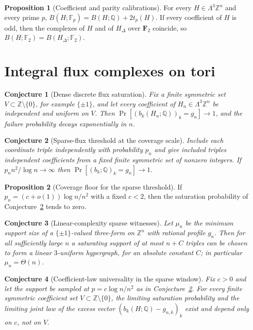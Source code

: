 \documentclass[11pt]{article}
\newtheorem{conjecture}{Conjecture}
\theoremstyle{definition}
\newcommand{\Z}{\mathbb Z}
\providecommand{\Z}{\mathbb Z}
\newtheorem{proposition}{Proposition}
\begin{document}
\begin{proposition}[Coefficient and parity calibrations]\label{aa:uct}
For every $H\in\Lambda^3\Z^n$ and every prime $p$, $B(H;\mathbb F_p)=B(H;\mathbb Q)+2t_p(H)$.  If every coefficient of $H$ is odd, then the complexes of $H$ and of $H_\Delta$ over $\mathbf F_2$ coincide, so $B(H;\mathbb F_2)=B(H_\Delta;\mathbb F_2)$.
\end{proposition}

\section{Integral flux complexes on tori}

\begin{conjecture}[Dense discrete flux saturation]\label{aa1}
Fix a finite symmetric set $V\subset\Z\setminus\{0\}$, for example $\{\pm1\}$, and let every coefficient of $H_n\in\Lambda^3\Z^n$ be independent and uniform on $V$.  Then $\Pr[(b_k(H_n;\mathbb Q))_k=g_n]\to1$, and the failure probability decays exponentially in $n$.
\end{conjecture}

\begin{conjecture}[Sparse-flux threshold at the coverage scale]\label{aa2}
Include each coordinate triple independently with probability $p_n$ and give included triples independent coefficients from a fixed finite symmetric set of nonzero integers.  If $p_nn^2/\log n\to\infty$ then $\Pr[(b_k;\mathbb Q)_k=g_n]\to1$.
\end{conjecture}

\begin{proposition}[Coverage floor for the sparse threshold]\label{aa:coverage}
If $p_n=(c+o(1))\log n/n^2$ with a fixed $c<2$, then the saturation probability of Conjecture~\ref{aa2} tends to zero.
\end{proposition}

\begin{conjecture}[Linear-complexity sparse witnesses]\label{aa3}
Let $\mu_n$ be the minimum support size of a $\{\pm1\}$-valued three-form on $\Z^n$ with rational profile $g_n$.  Then for all sufficiently large $n$ a saturating support of at most $n+C$ triples can be chosen to form a linear $3$-uniform hypergraph, for an absolute constant $C$; in particular $\mu_n=\Theta(n)$.
\end{conjecture}

\begin{conjecture}[Coefficient-law universality in the sparse window]\label{aa4}
Fix $c>0$ and let the support be sampled at $p=c\log n/n^2$ as in Conjecture~\ref{aa2}.  For every finite symmetric coefficient set $V\subset\Z\setminus\{0\}$, the limiting saturation probability and the limiting joint law of the excess vector $(b_k(H;\mathbb Q)-g_{n,k})_k$ exist and depend only on $c$, not on $V$.
\end{conjecture}
\end{document}
